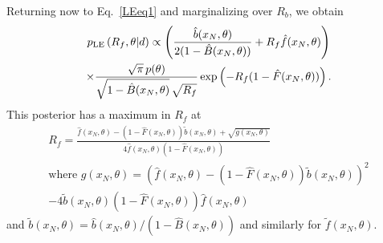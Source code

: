 \documentclass[aps,prd,reprint,nofootinbib]{revtex4-1}
\begin{document}
Returning now to Eq.~\eqref{LEeq1} and marginalizing over $R_b$, we obtain
\begin{multline}
p_{\rm LE}\left( R_f, \theta | d \right) \propto \left(
\frac{\hat{b}(x_N,\theta)}{2(1-\hat{B}(x_N,\theta))} + R_f
\hat{f}(x_N,\theta)\right) \\ \times \frac{\sqrt{\pi}\,
  p(\theta)}{\sqrt{1-\hat{B}(x_N,\theta)}\,\sqrt{R_f}}
\exp\left(-R_f(1-\hat{F}(x_N,\theta))\right) .
\end{multline}
This posterior has a maximum in $R_f$ at
\begin{multline}
R_f =
\frac{\hat{f}(x_N,\theta)-(1-\hat{F}(x_N,\theta))\tilde{b}(x_N,\theta)
  + \sqrt{g(x_N,\theta)}}{4\hat{f}(x_N,\theta)(1-\hat{F}(x_N,\theta))} \\
\mbox{where }  g(x_N,\theta) =\left(\hat{f}(x_N,\theta)-(1-\hat{F}(x_N,\theta))\tilde{b}(x_N,\theta)\right)^2
    \\ - 4\tilde{b}(x_N,\theta)(1-\hat{F}(x_N,\theta))\hat{f}(x_N,\theta)
\end{multline}
and $\tilde{b}(x_N,\theta) = \hat{b}(x_N,\theta) /(1-\hat{B}(x_N,\theta))$ and similarly for $\tilde{f}(x_N,\theta)$.
\end{document}
